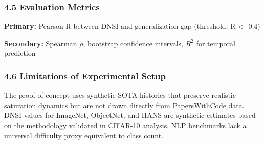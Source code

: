 \subsubsection{4.5 Evaluation Metrics}

\textbf{Primary:} Pearson R between DNSI and generalization gap (threshold: R < -0.4)

\textbf{Secondary:} Spearman $\rho$, bootstrap confidence intervals, $R^2$ for temporal prediction

\subsubsection{4.6 Limitations of Experimental Setup}

The proof-of-concept uses synthetic SOTA histories that preserve realistic saturation dynamics but are not drawn directly from PapersWithCode data. DNSI values for ImageNet, ObjectNet, and HANS are synthetic estimates based on the methodology validated in CIFAR-10 analysis. NLP benchmarks lack a universal difficulty proxy equivalent to class count.
